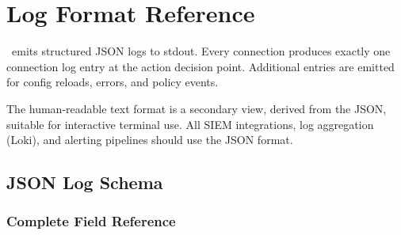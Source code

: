 
\chapter{Log Format Reference}
\label{ch:logformat}

\begin{chapterquote}
\ja\ emits structured JSON logs to stdout. Every connection produces exactly one
connection log entry at the action decision point. Additional entries are emitted
for config reloads, errors, and policy events.
\end{chapterquote}

 The human-readable text format is a
secondary view, derived from the JSON, suitable for interactive terminal use.
All SIEM integrations, log aggregation (Loki), and alerting pipelines should use
the JSON format.

\section{JSON Log Schema}

\subsection{Complete Field Reference}


